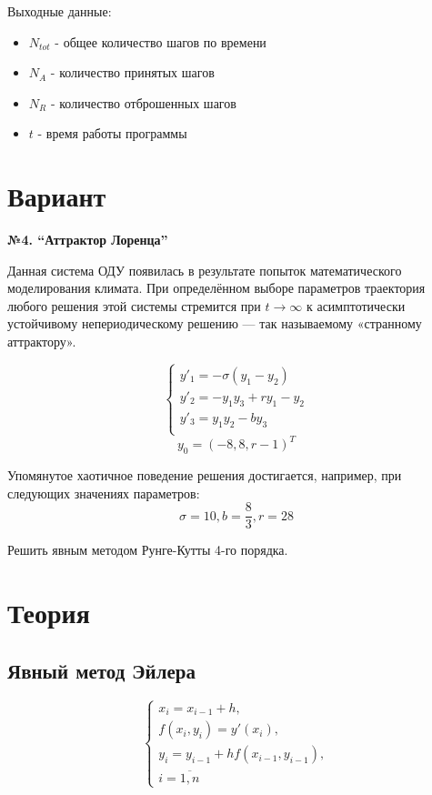 \documentclass[oneside, final, 11pt]{article}
\begin{document}
Выходные данные:
\begin{itemize}
    \item $N_{tot}$ - общее количество шагов по времени
    \item $N_A$ - количество принятых шагов
    \item $N_R$ - количество отброшенных шагов
    \item $t$ - время работы программы
\end{itemize}


\section{Вариант}
\begin{center}
    \bf №4. ``Аттрактор Лоренца''
\end{center}

Данная система ОДУ появилась в результате попыток математического моделирования климата. При определённом выборе параметров траектория любого решения этой системы стремится при $t \rightarrow \infty$ к асимптотически устойчивому непериодическому решению — так называемому «странному аттрактору».

\begin{equation}
    \begin{cases}
    y'_1 = -\sigma(y_1 - y_2) \\
    y'_2 = -y_1 y_3 + r y_1 - y_2\\
    y'_3 = y_1 y_2 - b y_3 \\
    \end{cases}
\end{equation}
\begin{equation}
    y_0 = (-8,8,r-1)^T
\end{equation}

Упомянутое хаотичное поведение решения достигается, например, при следующих значениях параметров:
\begin{equation}
    \sigma = 10, b = \frac{8}{3}, r = 28
\end{equation}

Решить явным методом Рунге-Кутты 4-го порядка.

\section{Теория}

\subsection{Явный метод Эйлера}
\begin{equation}
    \begin{cases}
    x_i = x_{i-1} + h, \\
    f(x_i, y_i) = y'(x_i), \\
    y_i = y_{i-1} + h f(x_{i-1}, y_{i-1}), \\
    i=\overline{1,n}
    \end{cases}
\end{equation}
\end{document}
